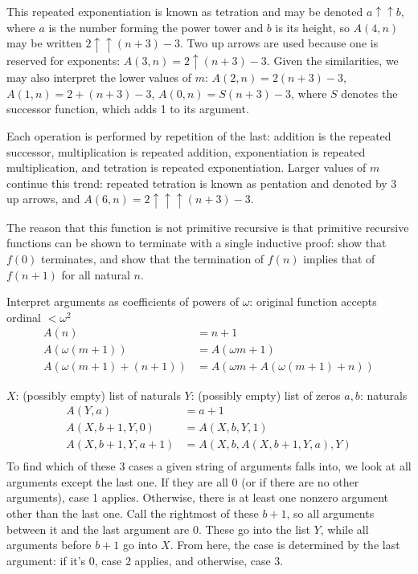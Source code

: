 \documentclass{article}
\begin{document}
This repeated exponentiation is known as tetration
and may be denoted $a \uparrow \uparrow b$,
where $a$ is the number forming the power tower
and $b$ is its height,
so $A(4, n)$ may be written $2\uparrow\uparrow(n+3)-3$.
Two up arrows are used because one is reserved for exponents:
$A(3, n) = 2\uparrow(n+3)-3$.
Given the similarities,
we may also interpret the lower values of $m$:
$A(2, n) = 2(n+3)-3$, $A(1, n) = 2+(n+3)-3$, $A(0, n) = S(n+3)-3$,
where $S$ denotes the successor function,
which adds 1 to its argument.

Each operation is performed by repetition of the last:
addition is the repeated successor,
multiplication is repeated addition,
exponentiation is repeated multiplication,
and tetration is repeated exponentiation.
Larger values of $m$ continue this trend:
repeated tetration is known as pentation and denoted by 3 up arrows,
and $A(6, n) = 2\uparrow\uparrow\uparrow(n+3)-3$.

The reason that this function is not primitive recursive
is that primitive recursive functions can be shown to terminate with a single inductive proof:
show that $f(0)$ terminates,
and show that the termination of $f(n)$ implies that of $f(n+1)$ for all natural $n$.

Interpret arguments as coefficients of powers of $\omega$:
original function accepts ordinal $<\omega^2$
\begin{align*}
  A(n) &= n+1 \\
  A(\omega(m+1)) &= A(\omega m+1) \\
  A(\omega(m+1)+(n+1)) &= A(\omega m+A(\omega(m+1)+n))
\end{align*}

$X$: (possibly empty) list of naturals
$Y$: (possibly empty) list of zeros
$a, b$: naturals
\begin{align*}
  A(Y, a) &= a+1 \\
  A(X, b+1, Y, 0) &= A(X, b, Y, 1) \\
  A(X, b+1, Y, a+1) &= A(X, b, A(X, b+1, Y, a), Y) \\
\end{align*}
To find which of these 3 cases a given string of arguments falls into,
we look at all arguments except the last one.
If they are all 0 (or if there are no other arguments), case 1 applies.
Otherwise, there is at least one nonzero argument other than the last one.
Call the rightmost of these $b+1$,
so all arguments between it and the last argument are 0.
These go into the list $Y$,
while all arguments before $b+1$ go into $X$.
From here, the case is determined by the last argument:
if it's 0, case 2 applies,
and otherwise, case 3.
\end{document}
